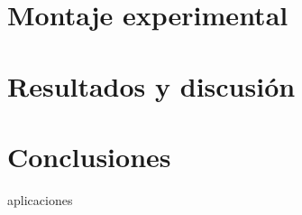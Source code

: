 \documentclass{article}
\begin{document}
\section{Montaje experimental}
\newpage

\section{Resultados y discusión}
\newpage

\section{Conclusiones}
\newpage



\noindent aplicaciones


\newpage



\end{document}
